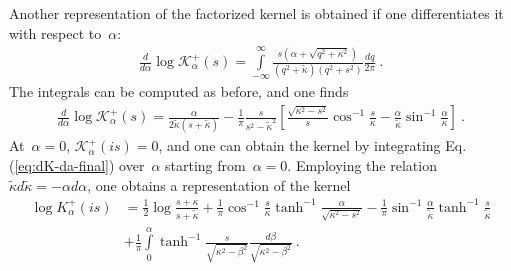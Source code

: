 \documentclass[preprint,aps,eqsecnum, prb]{revtex4-1}
\newcommand{\fplus}[1]{{#1}^{+}}
\begin{document}
Another representation of the factorized kernel is obtained if one
differentiates it with respect to~$\alpha$:
\begin{align}
  \frac{d}{d\alpha}\log \fplus{\mathcal{K}}_{\alpha} (s)
  = \int\limits_{-\infty}^{\infty}
  \frac{s (\alpha + \sqrt{q^2 + \kappa^2})}{
  \left(q^2 + {\tilde \kappa}\right)(q^2 + s^2)} \frac{dq}{2\pi}
  \ .
\end{align}
The integrals can be computed as before, and one finds
\begin{align}
  \label{eq:dK-da-final}
  \frac{d}{d\alpha}\log \fplus{\mathcal{K}}_{\alpha}(s)
  = \frac{\alpha}{2{\tilde{\kappa}} (s + {\tilde{\kappa}})}
 - \frac{1}{\pi} \frac{s}{s^2 - \tilde{\kappa}^2}
  \left[
  \frac{\sqrt{\kappa^2 - s^2}}{s} \cos^{-1}\frac{s}{\kappa}
  - \frac{\alpha}{\tilde{\kappa}} \sin^{-1}\frac{\alpha}{\kappa}
  \right]\ .
\end{align}
At~$\alpha = 0$, $\fplus{\mathcal{K}}_\alpha(is) = 0$, and one can
obtain the kernel by integrating Eq.(\ref{eq:dK-da-final}) over~$\alpha$
starting from~$\alpha = 0$.
Employing the relation~$\tilde{\kappa}d\tilde{\kappa}  = - \alpha d\alpha$,
one obtains a representation of the kernel
\begin{align}
\label{eq:logK-integral}
\log \fplus{K}_\alpha(is) &=
\frac{1}{2} \log\frac{s + \kappa}{s + \tilde{\kappa}}
+ \frac{1}{\pi} \cos^{-1}\frac{s}{\kappa}
     \tanh^{-1}\frac{\alpha}{\sqrt{\kappa^2 - s^2}}
-\frac{1}{\pi} \sin^{-1}\frac{\alpha}{\tilde{\kappa}}
     \tanh^{-1} \frac{s}{\tilde{\kappa}}
\\\nonumber
&+ \frac{1}{\pi}\int\limits_{0}^{\alpha}
     \tanh^{-1}\frac{s}{\sqrt{\kappa^2 - \beta^2}}
      \frac{d\beta}{\sqrt{\kappa^2 - \beta^2}}\ .
\end{align}

\end{document}
